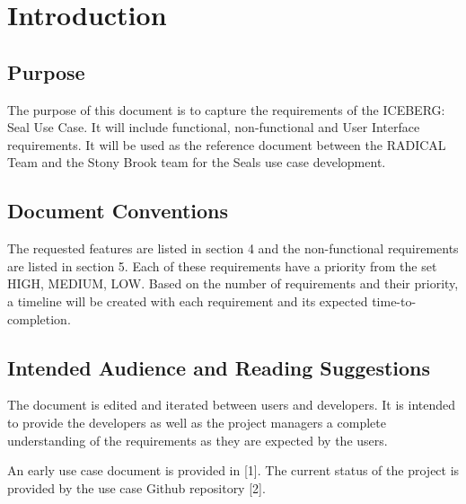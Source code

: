 \documentclass{scrreprt}
\begin{document}
\chapter{Introduction}

\section{Purpose}
The purpose of this document is to capture the requirements of the ICEBERG: Seal
Use Case. It will include functional, non-functional and User Interface requirements.
It will be used as the reference document between the RADICAL Team and the Stony 
Brook team for the Seals use case development.

\section{Document Conventions}
The requested features are listed in section 4 and the non-functional requirements are
listed in section 5. Each of these requirements have a priority from the set {HIGH,
MEDIUM, LOW}. Based on the number of requirements and their priority, a timeline
will be created with each requirement and its expected time-to-completion.

\section{Intended Audience and Reading Suggestions}

The document is edited and iterated between users and developers. It is intended
to provide the developers as well as the project managers a complete understanding 
of the requirements as they are expected by the users.

An early use case document is provided in [1]. The current status of the project is
provided by the use case Github repository [2].
\end{document}
